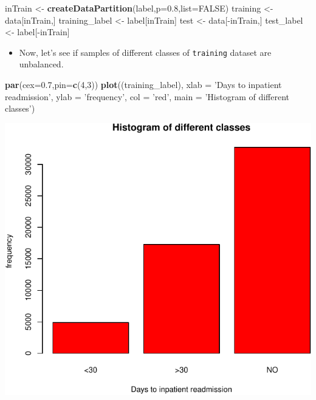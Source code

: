 \documentclass[]{article}
\newenvironment{Shaded}{\begin{snugshade}}{\end{snugshade}}
\newcommand{\KeywordTok}[1]{\textcolor[rgb]{0.13,0.29,0.53}{\textbf{{#1}}}}
\newcommand{\DataTypeTok}[1]{\textcolor[rgb]{0.13,0.29,0.53}{{#1}}}
\newcommand{\DecValTok}[1]{\textcolor[rgb]{0.00,0.00,0.81}{{#1}}}
\newcommand{\FloatTok}[1]{\textcolor[rgb]{0.00,0.00,0.81}{{#1}}}
\newcommand{\StringTok}[1]{\textcolor[rgb]{0.31,0.60,0.02}{{#1}}}
\newcommand{\OtherTok}[1]{\textcolor[rgb]{0.56,0.35,0.01}{{#1}}}
\newcommand{\NormalTok}[1]{{#1}}
\begin{document}
\begin{Shaded}
\begin{Highlighting}[]
\NormalTok{inTrain <-}\StringTok{ }\KeywordTok{createDataPartition}\NormalTok{(label,}\DataTypeTok{p=}\FloatTok{0.8}\NormalTok{,}\DataTypeTok{list=}\OtherTok{FALSE}\NormalTok{)}
\NormalTok{training <-}\StringTok{ }\NormalTok{data[inTrain,]}
\NormalTok{training_label <-}\StringTok{ }\NormalTok{label[inTrain]}
\NormalTok{test <-}\StringTok{ }\NormalTok{data[-inTrain,]}
\NormalTok{test_label <-}\StringTok{ }\NormalTok{label[-inTrain]}
\end{Highlighting}
\end{Shaded}

\begin{itemize}
\itemsep1pt\parskip0pt
\item
  Now, let's see if samples of different classes of \texttt{training}
  dataset are unbalanced.
\end{itemize}

\begin{Shaded}
\begin{Highlighting}[]
\KeywordTok{par}\NormalTok{(}\DataTypeTok{cex=}\FloatTok{0.7}\NormalTok{,}\DataTypeTok{pin=}\KeywordTok{c}\NormalTok{(}\DecValTok{4}\NormalTok{,}\DecValTok{3}\NormalTok{))}
\KeywordTok{plot}\NormalTok{((training_label), }\DataTypeTok{xlab =} \StringTok{'Days to inpatient readmission'}\NormalTok{, }\DataTypeTok{ylab =} \StringTok{'frequency'}\NormalTok{,}
     \DataTypeTok{col =} \StringTok{'red'}\NormalTok{, }\DataTypeTok{main =} \StringTok{'Histogram of different classes'}\NormalTok{)}
\end{Highlighting}
\end{Shaded}

\includegraphics{Project_files/figure-latex/Preprocessing_classtype-1.pdf}
\end{document}

